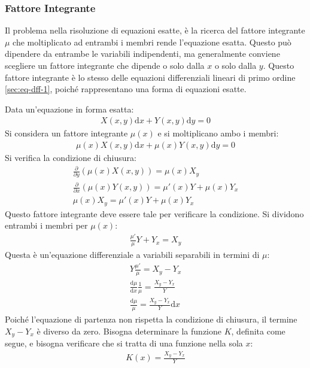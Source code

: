 \documentclass{article}
\newcommand{\df}{\mathrm{d}}
\numberwithin{equation}{subsection}
\begin{document}
\subsubsection{Fattore Integrante}

Il problema nella risoluzione di equazioni esatte, è la ricerca del fattore integrante $\mu$ che moltiplicato ad entrambi i membri rende l'equazione esatta. Questo può dipendere da entrambe le variabili indipendenti, ma generalmente conviene scegliere un fattore integrante che dipende o solo dalla $x$ o solo dalla $y$. 
Questo fattore integrante è lo stesso delle equazioni differenziali lineari di primo ordine \ref{sec:eq-dff-1}, poiché rappresentano una forma di equazioni esatte. 

Data un'equazione in forma esatta:
\begin{gather*}
    X(x,y)\df x+Y(x,y)\df y=0
\end{gather*}
Si considera un fattore integrante $\mu(x)$ e si moltiplicano ambo i membri:
\begin{gather*}
    \mu(x)X(x,y)\df x+\mu(x)Y(x,y)\df y=0
\end{gather*}
Si verifica la condizione di chiusura:
\begin{gather*}
    \frac{\partial}{\partial y}\left(\mu(x)X(x,y)\right)=\mu(x)X_y\\
    \frac{\partial}{\partial x}\left(\mu(x)Y(x,y)\right)=\mu'(x)Y+\mu(x)Y_x\\
    \mu(x)X_y=\mu'(x)Y+\mu(x)Y_x  
\end{gather*}
Questo fattore integrante deve essere tale per verificare la condizione. Si dividono entrambi i membri per $\mu(x)$:
\begin{gather*}
    \frac{\mu'}{\mu}Y+Y_x=X_y    
\end{gather*}
Questa è un'equazione differenziale a variabili separabili in termini di $\mu$:
\begin{gather*}
    Y\frac{\mu'}{\mu}=X_y-Y_x\\
    \frac{\df \mu}{\df x}\frac{1}{\mu}=\frac{X_y-Y_x}{Y}\\
    \frac{\df\mu}{\mu}=\frac{X_y-Y_x}{Y}\df x
\end{gather*}
Poiché l'equazione di partenza non rispetta la condizione di chiusura, il termine $X_y-Y_x$ è diverso da zero. Bisogna determinare la funzione $K$, definita come segue, e bisogna verificare che si tratta di una funzione nella sola $x$:
\begin{gather}
    K(x)=\frac{X_y-Y_x}{Y}
\end{gather}
\end{document}
